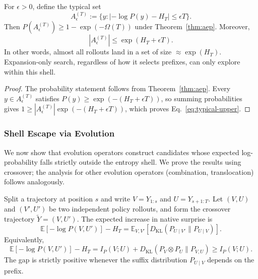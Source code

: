 \begin{corollary}
\label{cor:shell}
For $\epsilon>0$, define the typical set
\begin{equation}
  A_\epsilon^{(T)}:=\{y:|-\log P(y)-H_T|\le\epsilon T\}.
\end{equation}
Then $P(A_\epsilon^{(T)})\ge1-\exp(-\Omega(T))$ under Theorem~\ref{thm:aep}. Moreover,
\begin{equation}
  |A_\epsilon^{(T)}|\le\exp(H_T+\epsilon T).
  \label{eq:typical-upper}
\end{equation}
In other words, almost all rollouts land in a set of size $\approx \exp(H_T)$. Expansion-only search, regardless of how it selects prefixes, can only explore within this shell.
\end{corollary}

\begin{proof}
The probability statement follows from Theorem~\ref{thm:aep}. Every $y\in A_\epsilon^{(T)}$ satisfies $P(y)\ge\exp(-(H_T+\epsilon T))$, so summing probabilities gives $1\ge |A_\epsilon^{(T)}|\exp(-(H_T+\epsilon T))$, which proves Eq.~\eqref{eq:typical-upper}.
\end{proof}

\subsubsection{Shell Escape via Evolution}

We now show that evolution operators construct candidates whose expected log-probability falls strictly outside the entropy shell. We prove the results using crossover; the analysis for other evolution operators (combination, translocation) follows analogously.

\begin{lemma}
\label{lem:splice}
Split a trajectory at position $s$ and write $V=Y_{1:s}$ and $U=Y_{s+1:T}$. Let $(V,U)$ and $(V',U')$ be two independent policy rollouts, and form the crossover trajectory $\widetilde{Y}=(V,U')$. The expected increase in native surprise is
\begin{equation}
  \mathbb{E}[-\log P(V,U')]-H_T
  =\mathbb{E}_{V,V'}
  \left[D_{\mathrm{KL}}(P_{U\mid V'}\|P_{U\mid V})\right].
  \label{eq:splice-kl}
\end{equation}
Equivalently,
\begin{equation}
  \mathbb{E}[-\log P(V,U')]-H_T
  =I_P(V;U)+D_{\mathrm{KL}}(P_V\otimes P_U\|P_{V,U})
  \ge I_P(V;U).
  \label{eq:splice-mi}
\end{equation}
The gap is strictly positive whenever the suffix distribution $P_{U\mid V}$ depends on the prefix.
\end{lemma}

